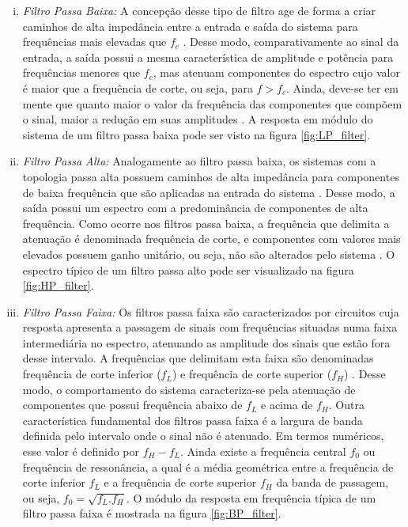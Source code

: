 \begin{enumerate}[i),leftmargin=1.75cm,itemindent=0cm] %
	\item 
	\textit{Filtro Passa Baixa:} A concepção desse tipo de filtro age de forma a criar caminhos de alta impedância entre a entrada e saída do sistema para frequências mais elevadas que $f_c$ \cite{Kassick2010}. Desse modo, comparativamente ao sinal da entrada, a saída possui a mesma característica de amplitude e potência para frequências menores que $f_c$, mas atenuam componentes do espectro cujo valor é maior que a frequência de corte, ou seja, para $f>f_c$. Ainda, deve-se ter em mente que quanto maior o valor da frequência das componentes que compõem o sinal, maior a redução em suas amplitudes \cite{Mussoi2004}. A resposta em módulo do sistema de um filtro passa baixa pode ser visto na figura \ref{fig:LP_filter}.

	\item 
	\textit{Filtro Passa Alta:} Analogamente ao filtro passa baixa, os sistemas com a topologia passa alta possuem caminhos de alta impedância para componentes de baixa frequência que são aplicadas na entrada do sistema \cite{Kassick2010}. Desse modo, a saída possui um espectro com a predominância de componentes de alta frequência. Como ocorre nos filtros passa baixa, a frequência que delimita a atenuação é denominada frequência de corte, e componentes com valores mais elevados possuem ganho unitário, ou seja, não são alterados pelo sistema \cite{Mussoi2004}. O espectro típico de um filtro passa alto pode ser visualizado na figura \ref{fig:HP_filter}. 
		
	\item 
	\textit{Filtro Passa Faixa:} Os filtros passa faixa são caracterizados por circuitos cuja resposta apresenta a passagem de sinais com frequências situadas numa faixa intermediária no espectro, atenuando as amplitude dos sinais que estão fora desse intervalo. A frequências que delimitam esta faixa são denominadas frequência de corte inferior ($f_L$) e frequência de corte superior ($f_H$) \cite{Mussoi2004}. Desse modo, o comportamento do sistema caracteriza-se pela atenuação de componentes que possui frequência abaixo de $f_L$ e acima de $f_H$. Outra característica fundamental dos filtros passa faixa é a largura de banda definida pelo intervalo onde o sinal não é atenuado. Em termos numéricos, esse valor é definido por $f_H-f_L$. Ainda existe a frequência central $f_0$ ou frequência de ressonância, a qual é a média geométrica entre a frequência de corte inferior $f_L$ e a frequência de corte superior $f_H$ da banda de passagem, ou seja, $f_0=\sqrt{f_L.f_H}$. O módulo da resposta em frequência típica de um filtro passa faixa é mostrada na figura \ref{fig:BP_filter}.
		

\end{enumerate}
